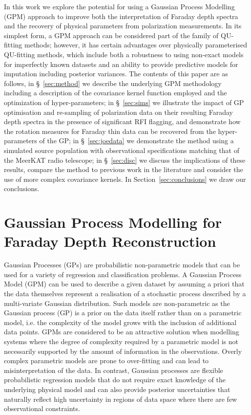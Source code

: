 \documentclass[fleqn,usenatbib]{mnras}
\begin{document}
In this work we explore the potential for using a Gaussian Process Modelling (GPM) approach to improve both the interpretation of Faraday depth spectra and the recovery of physical parameters from polarization measurements. In its simplest form, a GPM approach can be considered part of the family of QU-fitting methods; however, it has certain advantages over physically parameterised QU-fitting methods, which include both a robustness to using non-exact models for imperfectly known datasets and an ability to provide predictive models for imputation including posterior variances.  The contents of this paper are as follows, in \S~\ref{sec:method} we describe the underlying GPM methodology including a description of the covariance kernel function employed and the optimization of hyper-parameters; in \S~\ref{sec:sims} we illustrate the impact of GP optimisation and re-sampling of polarization data on their resulting Faraday depth spectra in the presence of significant RFI flagging, and demonstrate how the rotation measures for Faraday thin data can be recovered from the hyper-parameters of the GP; in \S~\ref{sec:joedata} we demonstrate the method using a simulated source population with observational specifications matching that of the MeerKAT radio telescope; in \S~\ref{sec:disc} we discuss the implications of these results, compare the method to previous work in the literature and consider the use of more complex covariance kernels. In Section~\ref{sec:conclusions} we draw our conclusions.

\section{Gaussian Process Modelling for Faraday Depth Reconstruction}
\label{sec:astrogpm}

Gaussian Processes (GPs) are probabilistic non-parametric models that can be used for a variety of regression and classification problems. A Gaussian Process Model (GPM) can be used to describe a given dataset by assuming a priori that the data themselves represent a realisation of a stochastic process described by a multi-variate Gaussian distribution. Such models are non-parametric as the Gaussian process (GP) is a prior on the data itself rather than on a parametric model, i.e. the complexity of the model grows with the inclusion of additional data points. GPMs are considered to be an attractive solution when modelling systems where the degree of complexity required by a parametric model is not necessarily supported by the amount of information in the observations. Overly complex parametric models are prone to over-fitting and can lead to misinterpretation of the data. In contrast, Gaussian processes are flexible probabilistic regression models that do not require exact knowledge of the underlying physical model and can also provide posterior uncertainties that naturally reflect high uncertainty in regions of data space where there are few observational constraints.
\end{document}
